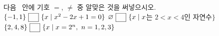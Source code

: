 다음 \blank\ 안에 기호 $=$, $\ne$ 중 알맞은 것을 써넣으시오.
 $\{-1{,}\mkern3mu\mathopen{}1\}\ \blank\ \{x \mid x^2-2x+1=0\}$
 $\varnothing\ \blank\ \{x \mid x$는 $2<x<4$인 자연수$\}$
 $\{2{,}\mkern3mu\mathopen{}4{,}\mkern3mu\mathopen{}8\}\ \blank\ \{x \mid x=2^n,\ n=1{,}\mkern3mu\mathopen{}2{,}\mkern3mu\mathopen{}3\}$
